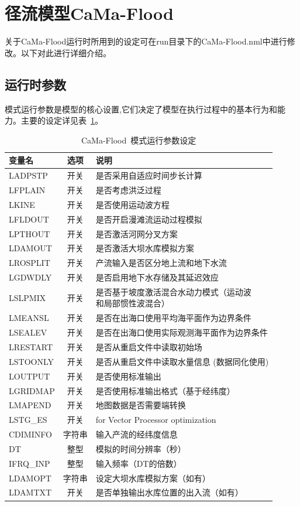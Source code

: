 \documentclass[a4paper,12pt,twoside]{article}
\begin{document}
\section{径流模型CaMa-Flood}
关于CaMa-Flood运行时所用到的设定可在run目录下的CaMa-Flood.nml中进行修改。以下对此进行详细介绍。
\subsection{运行时参数}
模式运行参数是模型的核心设置,它们决定了模型在执行过程中的基本行为和能力。主要的设定详见表~\ref{模式运行参数设定}。

\begin{table}[htbp]
\caption{CaMa-Flood~模式运行参数设定}
\centering \renewcommand{\arraystretch}{1.5}
\label{模式运行参数设定}
\begin{tabular}{lcl}
\toprule
\textbf{变量名} & \textbf{选项} & \textbf{说明} \\\midrule

LADPSTP & 开关 & 是否采用自适应时间步长计算 \\
LFPLAIN & 开关 & 是否考虑洪泛过程 \\
LKINE & 开关 & 是否使用运动波方程 \\
LFLDOUT & 开关 & 是否开启漫滩流运动过程模拟 \\
LPTHOUT & 开关 & 是否激活河网分叉方案 \\
LDAMOUT & 开关 & 是否激活大坝水库模拟方案 \\
LROSPLIT & 开关 & 产流输入是否区分地上流和地下水流 \\
LGDWDLY & 开关 & 是否启用地下水存储及其延迟效应 \\
LSLPMIX & 开关 &
\makecell[l]{是否基于坡度激活混合水动力模式（运动波\\和局部惯性波混合）} \\
LMEANSL & 开关 & 是否在出海口使用平均海平面作为边界条件 \\
LSEALEV & 开关 & 是否在出海口使用实际观测海平面作为边界条件 \\
LRESTART & 开关 & 是否从重启文件中读取初始场 \\
LSTOONLY & 开关 & 是否从重启文件中读取水量信息 (数据同化使用) \\
LOUTPUT & 开关 & 是否使用标准输出 \\
LGRIDMAP & 开关 & 是否使用标准输出格式（基于经纬度） \\
LMAPEND & 开关 & 地图数据是否需要端转换 \\
LSTG\_ES & 开关 & for Vector Processor optimization \\
CDIMINFO & 字符串 & 输入产流的经纬度信息 \\
DT & 整型 & 模拟的时间分辨率（秒） \\
IFRQ\_INP & 整型 & 输入频率（DT的倍数） \\
LDAMOPT & 字符串 & 设定大坝水库模拟方案（如有） \\
LDAMTXT & 开关 & 是否单独输出水库位置的出入流（如有） \\
\bottomrule
\end{tabular}
\end{table}
\end{document}
